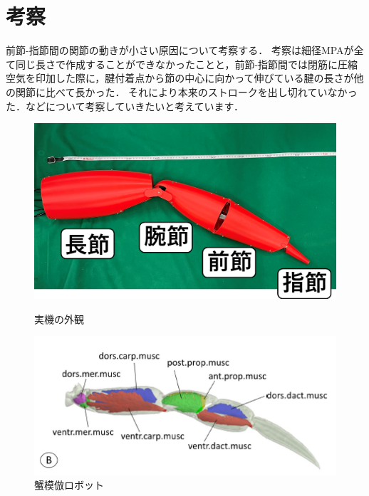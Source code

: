 \documentclass{jarticle}
\begin{document}
\section{考察}
前節-指節間の関節の動きが小さい原因について考察する．
考察は細径MPAが全て同じ長さで作成することができなかったことと，前節-指節間では閉筋に圧縮空気を印加した際に，腱付着点から節の中心に向かって伸びている腱の長さが他の関節に比べて長かった．
それにより本来のストロークを出し切れていなかった．などについて考察していきたいと考えています．
\begin{figure}[t]
  \begin{minipage}[b]{0.47\columnwidth}
    \centering
    \includegraphics[scale=0.1]{image/jikki_2.png}
    \vspace{-4mm}
    \caption{実機の外観}
    \label{fig:jikki}
  \end{minipage}
  \hspace{0.04\columnwidth}
  \begin{minipage}[b]{0.47\columnwidth}
    \centering
    \includegraphics[scale=0.35]{image/crabmuscle_campare.PNG}
    \vspace{-2mm}
    \caption{蟹模倣ロボット\cite{crab}}
    \label{fig:kinhaichi}
  \end{minipage}
\end{figure}
\end{document}
